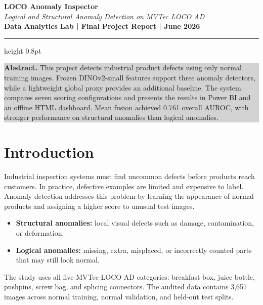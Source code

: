 \documentclass[10pt]{article}
\begin{document}
\fontsize{9.4}{10.8}\selectfont

\begin{center}
{\LARGE\bfseries\color{navy} LOCO Anomaly Inspector}\\[2pt]
{\large\itshape Logical and Structural Anomaly Detection on MVTec LOCO AD}\\[3pt]
{\small\bfseries\color{teal} Data Analytics Lab | Final Project Report | June 2026}
\end{center}
\vspace{-2pt}
\hrule height 0.8pt
\vspace{5pt}

\colorbox{lightgrey}{%
\parbox{\dimexpr\linewidth-2\fboxsep\relax}{%
\textbf{Abstract.} This project detects industrial product defects using only normal
training images. Frozen DINOv2-small features support three anomaly detectors, while a
lightweight global proxy provides an additional baseline. The system compares seven
scoring configurations and presents the results in Power BI and an offline HTML
dashboard. Mean fusion achieved 0.761 overall AUROC, with stronger performance on
structural anomalies than logical anomalies.}}

\section{Introduction}
Industrial inspection systems must find uncommon defects before products reach
customers. In practice, defective examples are limited and expensive to label.
Anomaly detection addresses this problem by learning the appearance of normal products
and assigning a higher score to unusual test images.

\begin{itemize}
\item \textbf{Structural anomalies:} local visual defects such as damage,
contamination, or deformation.
\item \textbf{Logical anomalies:} missing, extra, misplaced, or incorrectly counted
parts that may still look normal.
\end{itemize}

The study uses all five MVTec LOCO AD categories: breakfast box, juice bottle,
pushpins, screw bag, and splicing connectors. The audited data contains 3,651 images
across normal training, normal validation, and held-out test splits.
\end{document}
